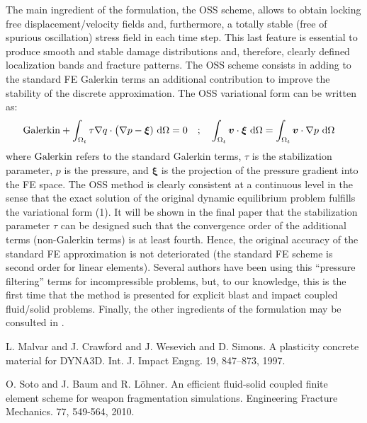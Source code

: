 The main ingredient of the formulation, the OSS scheme,
 allows to obtain locking free displacement/velocity fields and,
furthermore, a totally
stable (free of spurious oscillation) stress field in each time step. This last
feature is essential to produce smooth and stable damage distributions and,
therefore, clearly defined localization bands and fracture patterns. The OSS
scheme consists in adding to the standard FE Galerkin terms an additional
contribution to improve the stability of the discrete approximation. The OSS
variational form can be written as:
\begin{eqnarray}
{\rm Galerkin}
+\int_{\Omega_t} \tau\nabla q\cdot\bigl(\nabla p
-\bm \xi)~{\rm d}\Omega=0~~~;~~~\int_{\Omega_t} {\bm v}\cdot\bm \xi~{\rm d}\Omega=
\int_{\Omega_t} {\bm v}\cdot\nabla p~{\rm d}\Omega&&
\end{eqnarray}
\noindent where ${\rm Galerkin}$ refers to the standard Galerkin terms, 
$\tau$ is the stabilization parameter, $p$ is the
pressure, and $\bm \xi$ is the projection of the pressure gradient into the FE
space. The OSS method is clearly consistent at a continuous level in the sense that the
exact solution of the original dynamic equilibrium 
problem fulfills the variational form (1). It will be shown in the final paper
that the stabilization parameter $\tau$ can be designed such that the
convergence order of the additional terms (non-Galerkin terms) is at least
fourth. Hence, the original accuracy of the standard FE approximation is not
deteriorated (the standard FE scheme is second order for linear elements). Several authors have been using this
``pressure filtering'' terms for incompressible problems, but, to our
knowledge,  this is the
first time that the method is presented for explicit blast and impact coupled
fluid/solid problems. Finally, the other ingredients of the formulation may be consulted in \cite{soto2010}.



\begin{thebibliography}{10}

{\sc L. Malvar and J. Crawford and J. Wesevich and D. Simons}. {A plasticity concrete material for DYNA3D}.  Int. J. Impact Engng. 19, 847--873, 1997.



{\sc O. Soto and J. Baum and R. L\"ohner}. {An efficient fluid-solid  coupled finite element scheme for weapon fragmentation simulations}. Engineering Fracture Mechanics. 77, 549-564, 2010.

\end{thebibliography}
